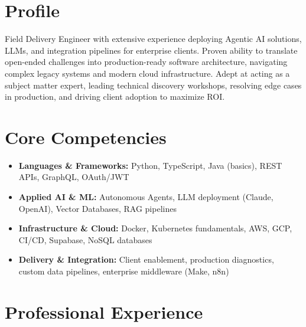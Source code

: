 \documentclass[11pt,a4paper,sans]{moderncv}
\begin{document}
\makecvtitle

\section{Profile}
Field Delivery Engineer with extensive experience deploying Agentic AI solutions, LLMs, and integration pipelines for enterprise clients. Proven ability to translate open-ended challenges into production-ready software architecture, navigating complex legacy systems and modern cloud infrastructure. Adept at acting as a subject matter expert, leading technical discovery workshops, resolving edge cases in production, and driving client adoption to maximize ROI.

\section{Core Competencies}
\begin{itemize}
\item \textbf{Languages \& Frameworks:} Python, TypeScript, Java (basics), REST APIs, GraphQL, OAuth/JWT
\item \textbf{Applied AI \& ML:} Autonomous Agents, LLM deployment (Claude, OpenAI), Vector Databases, RAG pipelines
\item \textbf{Infrastructure \& Cloud:} Docker, Kubernetes fundamentals, AWS, GCP, CI/CD, Supabase, NoSQL databases
\item \textbf{Delivery \& Integration:} Client enablement, production diagnostics, custom data pipelines, enterprise middleware (Make, n8n)
\end{itemize}

\section{Professional Experience}

\end{document}
